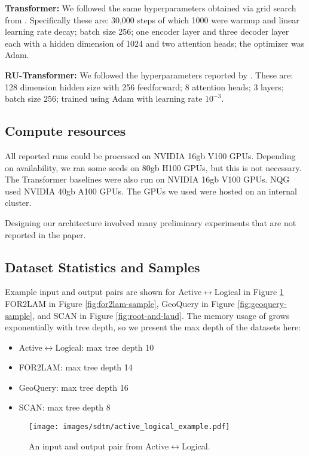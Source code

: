 \textbf{Transformer:} We followed the same hyperparameters obtained via grid search from \cite{Soulos_2023_DifferentiableTreeOperations}. Specifically these are: 30,000 steps of which 1000 were warmup and linear learning rate decay; batch size 256; one encoder layer and three decoder layer each with a hidden dimension of 1024 and two attention heads; the optimizer was Adam. 

\textbf{RU-Transformer:} We followed the hyperparameters reported by \cite{csordas-etal-2021-devil}. These are: 128 dimension hidden size with 256 feedforward; 8 attention heads; 3 layers; batch size 256; trained using Adam with learning rate $10^{-3}$. 

\subsection{Compute resources} \label{sec:sdtm-compute-resources}
All reported \sdtm runs could be processed on NVIDIA 16gb V100 GPUs. Depending on availability, we ran some seeds on 80gb H100 GPUs, but this is not necessary. The Transformer baselines were also run on NVIDIA 16gb V100 GPUs. NQG used NVIDIA 40gb A100 GPUs. The GPUs we used were hosted on an internal cluster. 

Designing our architecture involved many preliminary experiments that are not reported in the paper.

\subsection{Dataset Statistics and Samples} \label{sec:sdtm-data-stats-samples}
Example input and output pairs are shown for Active$\leftrightarrow$Logical in Figure \ref{fig:active-logical-sample}  FOR2LAM in Figure \ref{fig:for2lam-sample}, GeoQuery in Figure \ref{fig:geoquery-sample}, and SCAN in Figure \ref{fig:root-and-laud}. The memory usage of \dtm grows exponentially with tree depth, so we present the max depth of the datasets here:
\begin{itemize}
    \item Active$\leftrightarrow$Logical: max tree depth 10
    \item FOR2LAM: max tree depth 14
    \item GeoQuery: max tree depth 16
    \item SCAN: max tree depth 8
\end{itemize}


\begin{figure}
    \centering
    \texttt{[image: images/sdtm/active\_logical\_example.pdf]}
    \caption{An input and output pair from Active$\leftrightarrow$Logical. }
    \label{fig:active-logical-sample}
\end{figure}

